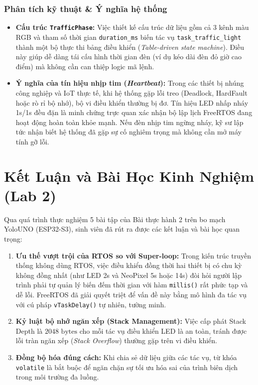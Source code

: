 \subsubsection{Phân tích kỹ thuật \& Ý nghĩa hệ thống}
\begin{itemize}
    \item \textbf{Cấu trúc \texttt{TrafficPhase}:} Việc thiết kế cấu trúc dữ liệu gồm cả 3 kênh màu RGB và tham số thời gian \texttt{duration\_ms} biến tác vụ \texttt{task\_traffic\_light} thành một bộ thực thi bảng điều khiển (\textit{Table-driven state machine}). Điều này giúp dễ dàng tái cấu hình thời gian đèn (ví dụ kéo dài đèn đỏ giờ cao điểm) mà không cần can thiệp logic mã lệnh.
    \item \textbf{Ý nghĩa của tín hiệu nhịp tim (\textit{Heartbeat}):} Trong các thiết bị nhúng công nghiệp và IoT thực tế, khi hệ thống gặp lỗi treo (Deadlock, HardFault hoặc rò rỉ bộ nhớ), bộ vi điều khiển thường bị đơ. Tín hiệu LED nhấp nháy 1s/1s đều đặn là minh chứng trực quan xác nhận bộ lập lịch FreeRTOS đang hoạt động hoàn toàn khỏe mạnh. Nếu đèn nhịp tim ngừng nháy, kỹ sư lập tức nhận biết hệ thống đã gặp sự cố nghiêm trọng mà không cần mở máy tính gỡ lỗi.
\end{itemize}

\newpage
\section{Kết Luận và Bài Học Kinh Nghiệm (Lab 2)}

Qua quá trình thực nghiệm 5 bài tập của Bài thực hành 2 trên bo mạch YoloUNO (ESP32-S3), sinh viên đã rút ra được các kết luận và bài học quan trọng:
\begin{enumerate}
    \item \textbf{Ưu thế vượt trội của RTOS so với Super-loop:} Trong kiến trúc truyền thống không dùng RTOS, việc điều khiển đồng thời hai thiết bị có chu kỳ không đồng nhất (như LED 2s và NeoPixel 5s hoặc 14s) đòi hỏi người lập trình phải tự quản lý biến đếm thời gian với hàm \texttt{millis()} rất phức tạp và dễ lỗi. FreeRTOS đã giải quyết triệt để vấn đề này bằng mô hình đa tác vụ với cú pháp \texttt{vTaskDelay()} tự nhiên, tường minh.
    \item \textbf{Kỷ luật bộ nhớ ngăn xếp (Stack Management):} Việc cấp phát Stack Depth là $2048\text{ bytes}$ cho mỗi tác vụ điều khiển LED là an toàn, tránh được lỗi tràn ngăn xếp (\textit{Stack Overflow}) thường gặp trên vi điều khiển.
    \item \textbf{Đồng bộ hóa đúng cách:} Khi chia sẻ dữ liệu giữa các tác vụ, từ khóa \texttt{volatile} là bắt buộc để ngăn chặn sự tối ưu hóa sai của trình biên dịch trong môi trường đa luồng.
\end{enumerate}
